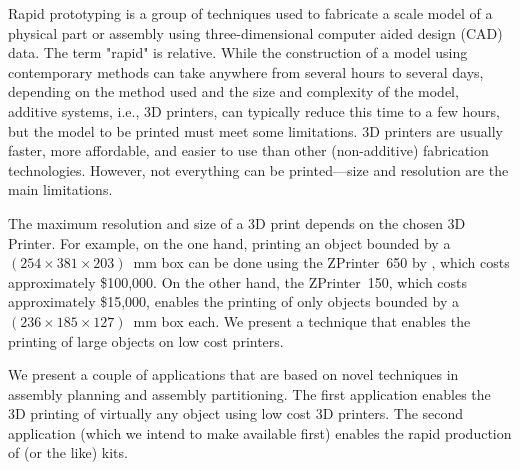 \documentclass{article}
\begin{document}
Rapid prototyping is a group of techniques used to fabricate a scale
model of a physical part or assembly using three-dimensional computer
aided design (CAD) data. The term "rapid" is relative. While the
construction of a model using contemporary methods can take anywhere
from several hours to several days, depending on the method used and
the size and complexity of the model, additive systems, i.e., 3D
printers, can typically reduce this time to a few hours, but the model
to be printed must meet some limitations. 3D printers are usually
faster, more affordable, and easier to use than other (non-additive)
fabrication technologies. However, not everything can be
printed---size and resolution are the main limitations. 

The maximum resolution and size of a 3D print depends on the chosen 3D
Printer. For example, on the one hand, printing an object bounded by a
$(254 \times 381 \times 203)$~mm box can be done using the
ZPrinter\textregistered{}~650 by \zcorp{}, which costs approximately
\$100,000. On the other hand, the ZPrinter\textregistered{}~150, which
costs approximately \$15,000, enables the printing of only objects
bounded by a $(236 \times 185 \times 127)$~mm box each. We present a
technique that enables the printing of large objects on low cost
printers.

We present a couple of applications that are based on novel techniques
in assembly planning and assembly partitioning. The first application
enables the 3D printing of virtually any object using low cost 3D
printers. The second application (which we intend to make
available first) enables the rapid production of \lego{} (or the like)
kits.



\end{document}
